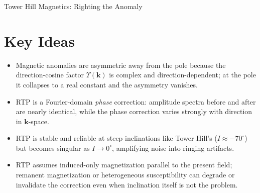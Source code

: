 \begin{activity}{Tower Hill Magnetics: Righting the Anomaly}
\begin{questions}
\end{questions}

\section*{Key Ideas}
\begin{itemize}
  \item Magnetic anomalies are asymmetric away from the pole because the direction-cosine factor $\Upsilon(\mathbf{k})$ is complex and direction-dependent; at the pole it collapses to a real constant and the asymmetry vanishes.
  \item RTP is a Fourier-domain \emph{phase} correction: amplitude spectra before and after are nearly identical, while the phase correction varies strongly with direction in $\mathbf{k}$-space.
  \item RTP is stable and reliable at steep inclinations like Tower Hill's ($I\approx-70^\circ$) but becomes singular as $I\to0^\circ$, amplifying noise into ringing artifacts.
  \item RTP assumes induced-only magnetization parallel to the present field; remanent magnetization or heterogeneous susceptibility can degrade or invalidate the correction even when inclination itself is not the problem.
\end{itemize}

\end{activity}
